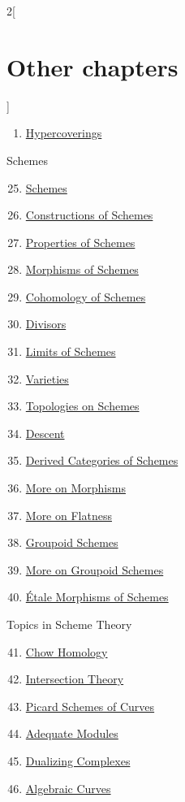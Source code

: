 \begin{multicols}{2}[\section{Other chapters}]
\begin{enumerate}
\item \hyperref[hypercovering-section-phantom]{Hypercoverings}
\end{enumerate}
Schemes
\begin{enumerate}
\setcounter{enumi}{24}
\item \hyperref[schemes-section-phantom]{Schemes}
\item \hyperref[constructions-section-phantom]{Constructions of Schemes}
\item \hyperref[properties-section-phantom]{Properties of Schemes}
\item \hyperref[morphisms-section-phantom]{Morphisms of Schemes}
\item \hyperref[coherent-section-phantom]{Cohomology of Schemes}
\item \hyperref[divisors-section-phantom]{Divisors}
\item \hyperref[limits-section-phantom]{Limits of Schemes}
\item \hyperref[varieties-section-phantom]{Varieties}
\item \hyperref[topologies-section-phantom]{Topologies on Schemes}
\item \hyperref[descent-section-phantom]{Descent}
\item \hyperref[perfect-section-phantom]{Derived Categories of Schemes}
\item \hyperref[more-morphisms-section-phantom]{More on Morphisms}
\item \hyperref[flat-section-phantom]{More on Flatness}
\item \hyperref[groupoids-section-phantom]{Groupoid Schemes}
\item \hyperref[more-groupoids-section-phantom]{More on Groupoid Schemes}
\item \hyperref[etale-section-phantom]{\'Etale Morphisms of Schemes}
\end{enumerate}
Topics in Scheme Theory
\begin{enumerate}
\setcounter{enumi}{40}
\item \hyperref[chow-section-phantom]{Chow Homology}
\item \hyperref[intersection-section-phantom]{Intersection Theory}
\item \hyperref[pic-section-phantom]{Picard Schemes of Curves}
\item \hyperref[adequate-section-phantom]{Adequate Modules}
\item \hyperref[dualizing-section-phantom]{Dualizing Complexes}
\item \hyperref[curves-section-phantom]{Algebraic Curves}

\end{enumerate}
\end{multicols}
